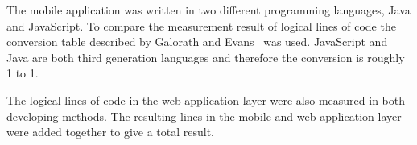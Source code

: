 The mobile application was written in two different programming languages, Java and JavaScript. To compare the measurement result of logical lines of code the conversion table described by Galorath and Evans~\cite[p.~163]{galorath2006} was used. JavaScript and Java are both third generation languages and therefore the conversion is roughly 1 to 1. 

The logical lines of code in the web application layer were also measured in both developing methods. The resulting lines in the mobile and web application layer were added together to give a total result. 